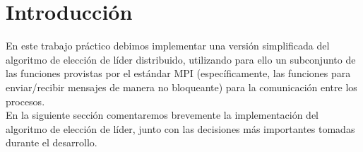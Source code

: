 \section{Introducci\'on}

En este trabajo práctico debimos implementar una versión simplificada del
algoritmo de elección de líder distribuido, utilizando para ello un subconjunto
de las funciones provistas por el estándar MPI (específicamente, las funciones
para enviar/recibir mensajes de manera no bloqueante) para la comunicación
entre los procesos.\\

En la siguiente sección comentaremos brevemente la implementación del algoritmo
de elección de líder, junto con las decisiones más importantes tomadas
durante el desarrollo.